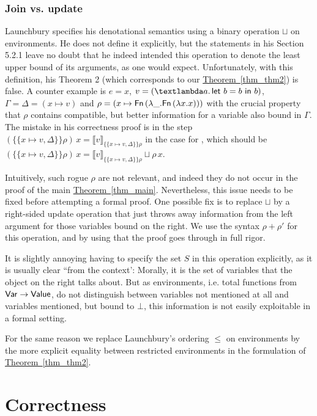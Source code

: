 \documentclass{jfp1}
\newcommand{\myref}[2]{\hyperref[#2]{#1~\ref*{#2}}}
\theoremstyle{nonumberbreak}
\newcommand{\sVar}   {\text{\textsf{Var}}}
\newcommand{\sValue} {\text{\textsf{Value}}}
\newcommand{\sFn}[1]{\text{\textsf{Fn}}\,(#1)}
\newcommand{\keyword}[1]{\text{\textsf{#1}}}
\newcommand{\sLam}[2]{\text{\textlambda} #1.\, #2}
\newcommand{\sLet}[2]{\keyword{let}~#1~\keyword{in}~#2}
\newcommand{\sRule}[1]{\text{{\textsc{#1}}}}
\newcommand{\dsem}[2]{\llbracket #1 \rrbracket_{#2}}
\newcommand{\esem}[1]{\{\!\!\!\{#1\}\!\!\!\}}
\newcommand{\upd}[1]{\mathop{++_{#1}}}
\begin{document}
\subsubsection{Join vs. update}

Launchbury specifies his denotational semantics using a binary operation $\sqcup$ on environments. He does not define it explicitly, but the statements in his Section 5.2.1 leave no doubt that he indeed intended this operation to denote the least upper bound of its arguments, as one would expect. Unfortunately, with this definition, his Theorem 2 (which corresponds to our \myref{Theorem}{thm_thm2}) is false. A counter example is $e = x$, $v = (\sLam{a}{\sLet{b = b}b})$, $\Gamma = \Delta = (x \mapsto v)$ and $\rho = (x \mapsto \sFn{\lambda \_. \sFn{\lambda x.x}})$ with the crucial property that $\rho$ contains compatible, but better information for a variable also bound in $\Gamma$. The mistake in his correctness proof is in the step $(\esem{x \mapsto v, \Delta}\rho)\,x = \dsem{v}{\esem{x \mapsto v, \Delta}\rho}$ in the case for \sRule{Var}, which should be $(\esem{x \mapsto v, \Delta}\rho)\,x = \dsem{v}{\esem{x \mapsto v, \Delta}\rho} \sqcup \rho\,x$.

Intuitively, such rogue $\rho$ are not relevant, and indeed they do not occur in the proof of the main \myref{Theorem}{thm_main}. Nevertheless, this issue needs to be fixed before attempting a formal proof. One possible fix is to replace $\sqcup$ by a right-sided update operation that just throws away information from the left argument for those variables bound on the right. We use the syntax $\rho \upd S \rho'$ for this operation, and by using that the proof goes through in full rigor.

It is slightly annoying having to specify the set $S$ in this operation explicitly, as it is usually clear ``from the context': Morally, it is the set of variables that the object on the right talks about. But as environments, i.e. total functions from $\sVar \to \sValue$, do not distinguish between variables not mentioned at all and variables mentioned, but bound to $\bot$, this information is not easily exploitable in a formal setting.

For the same reason we replace Launchbury’s ordering $\le$ on environments by the more explicit equality between restricted environments in the formulation of \myref{Theorem}{thm_thm2}.

\section{Correctness}
\end{document}

